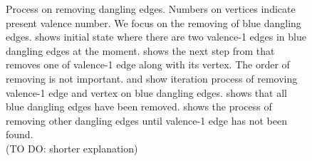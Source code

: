 \documentclass[a4paper,twoside]{article}
\begin{document}
\begin{figure}[h!]
	\caption[]{Process on removing dangling edges. Numbers on vertices indicate present valence number. We focus on the removing of blue dangling edges.  shows initial state where there are two valence-1 edges in blue dangling edges at the moment.  shows the next step from  that removes one of valence-1 edge along with its vertex. The order of removing is not important.  and  show iteration process of removing valence-1 edge and vertex on blue dangling edges.  shows that all blue dangling edges have been removed.  shows the process of removing other dangling edges until valence-1 edge has not been found.\\(TO DO: shorter explanation)}
	\label{fig:fig-original_remove_dangling_edges_step_by_step}
\end{figure}
\end{document}
